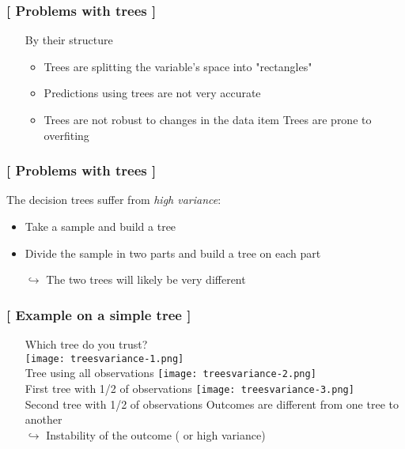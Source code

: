 \documentclass[xcolor=x11names,compress, handhouts]{beamer}
\renewcommand{\(}{\begin{columns}}
\renewcommand{\)}{\end{columns}}
\newcommand{\<}[1]{\begin{column}{#1}}
\renewcommand{\>}{\end{column}}
\begin{document}
\begin{frame} %
\frametitle{\textcolor{brique}{[ Problems with  trees ]}}
\pause
\begin{itemize}
  \item[] By their structure
  \begin{itemize}[<+->]
    \item Trees are splitting the variable's space into "rectangles"
    \item Predictions using trees are not very accurate
    \item Trees are not robust to changes in the data
    item  Trees are prone to overfiting
  \end{itemize}
\end{itemize}
\end{frame}


\begin{frame}
\frametitle{\textcolor{brique}{[ Problems with  trees  ]}}
The decision trees  suffer from \textit{high variance}:
\pause
\begin{itemize}[<+->]
    \item Take a sample and build a tree
    \item Divide the sample in two parts and build a tree on each part
    \item[$\hookrightarrow$] The two trees will likely be very different
\end{itemize}
\end{frame}

\begin{frame} %
\frametitle{\textcolor{brique}{[ Example on a simple tree ]}}
\pause
\begin{itemize}
\item[] Which tree do you trust? \\
    {\texttt{[image: treesvariance-1.png]} \\ }
    {Tree using all observations}
    {\texttt{[image: treesvariance-2.png]} \\ }
    {First tree with 1/2 of observations}
    {\texttt{[image: treesvariance-3.png]} \\ }
    {Second tree with 1/2 of observations}
    {Outcomes are different from one tree to another\\ }
    {$\hookrightarrow$ Instability of the outcome ( or high variance)}
\end{itemize}
\end{frame}
\end{document}
